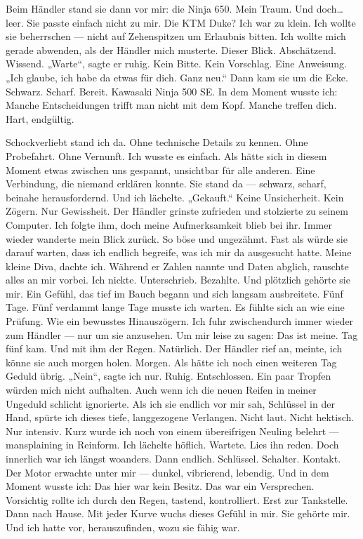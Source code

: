 Beim Händler stand sie dann vor mir: die Ninja 650. Mein Traum. Und doch… leer. Sie passte einfach nicht zu mir.
Die KTM Duke? Ich war zu klein. Ich wollte sie beherrschen — nicht auf Zehenspitzen um Erlaubnis bitten.
Ich wollte mich gerade abwenden, als der Händler mich musterte. Dieser Blick. Abschätzend. Wissend.
„Warte“, sagte er ruhig. Kein Bitte. Kein Vorschlag. Eine Anweisung. „Ich glaube, ich habe da etwas für dich. Ganz neu.“
Dann kam sie um die Ecke.
Schwarz. Scharf. Bereit.
Kawasaki Ninja 500 SE.
In dem Moment wusste ich: Manche Entscheidungen trifft man nicht mit dem Kopf. Manche treffen dich. Hart, endgültig.

Schockverliebt stand ich da.
Ohne technische Details zu kennen. Ohne Probefahrt. Ohne Vernunft.
Ich wusste es einfach.
Als hätte sich in diesem Moment etwas zwischen uns gespannt, unsichtbar für alle anderen. Eine Verbindung, die niemand erklären konnte.
Sie stand da — schwarz, scharf, beinahe herausfordernd.
Und ich lächelte.
„Gekauft.“
Keine Unsicherheit. Kein Zögern.
Nur Gewissheit.
Der Händler grinste zufrieden und stolzierte zu seinem Computer. Ich folgte ihm, doch meine Aufmerksamkeit blieb bei ihr. Immer wieder wanderte mein Blick zurück.
So böse und ungezähmt.
Fast als würde sie darauf warten, dass ich endlich begreife, was ich mir da ausgesucht hatte.
Meine kleine Diva, dachte ich.
Während er Zahlen nannte und Daten abglich, rauschte alles an mir vorbei. Ich nickte. Unterschrieb. Bezahlte.
Und plötzlich gehörte sie mir.
Ein Gefühl, das tief im Bauch begann und sich langsam ausbreitete.
Fünf Tage.
Fünf verdammt lange Tage musste ich warten.
Es fühlte sich an wie eine Prüfung. Wie ein bewusstes Hinauszögern.
Ich fuhr zwischendurch immer wieder zum Händler — nur um sie anzusehen. Um mir leise zu sagen:
Das ist meine.
Tag fünf kam.
Und mit ihm der Regen.
Natürlich.
Der Händler rief an, meinte, ich könne sie auch morgen holen.
Morgen.
Als hätte ich noch einen weiteren Tag Geduld übrig.
„Nein“, sagte ich nur. Ruhig. Entschlossen.
Ein paar Tropfen würden mich nicht aufhalten. Auch wenn ich die neuen Reifen in meiner Ungeduld schlicht ignorierte.
Als ich sie endlich vor mir sah, Schlüssel in der Hand, spürte ich dieses tiefe, langgezogene Verlangen. Nicht laut. Nicht hektisch.
Nur intensiv.
Kurz wurde ich noch von einem übereifrigen Neuling belehrt — mansplaining in Reinform. Ich lächelte höflich. Wartete.
Lies ihn reden.
Doch innerlich war ich längst woanders.
Dann endlich.
Schlüssel.
Schalter.
Kontakt.
Der Motor erwachte unter mir — dunkel, vibrierend, lebendig.
Und in dem Moment wusste ich:
Das hier war kein Besitz.
Das war ein Versprechen.
Vorsichtig rollte ich durch den Regen, tastend, kontrolliert. Erst zur Tankstelle. Dann nach Hause.
Mit jeder Kurve wuchs dieses Gefühl in mir.
Sie gehörte mir.
Und ich hatte vor, herauszufinden, wozu sie fähig war.

